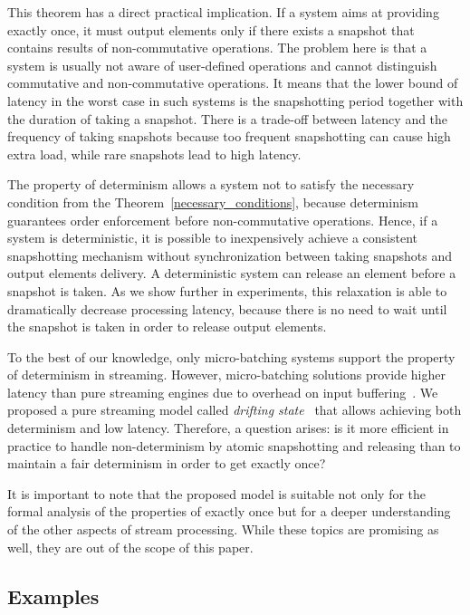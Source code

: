 This theorem has a direct practical implication. If a system aims at providing exactly once, it must output elements only if there exists a snapshot that contains results of non-commutative operations. The problem here is that a system is usually not aware of user-defined operations and cannot distinguish commutative and non-commutative operations. It means that the lower bound of latency in the worst case in such systems is the snapshotting period together with the duration of taking a snapshot. There is a trade-off between latency and the frequency of taking snapshots because too frequent snapshotting can cause high extra load, while rare snapshots lead to high latency.

The property of determinism allows a system not to satisfy the necessary condition from the Theorem~\ref{necessary_conditions}, because determinism guarantees order enforcement before non-commutative operations. Hence, if a system is deterministic, it is possible to inexpensively achieve a consistent snapshotting mechanism without synchronization between taking snapshots and output elements delivery. A deterministic system can release an element before a snapshot is taken. As we show further in experiments, this relaxation is able to dramatically decrease processing latency, because there is no need to wait until the snapshot is taken in order to release output elements.

To the best of our knowledge, only micro-batching systems support the property of determinism in streaming. However, micro-batching solutions provide higher latency than pure streaming engines due to overhead on input buffering~\cite{karimov2018benchmarking}. We proposed a pure streaming model called {\em drifting state}~\cite{we2018adbis} that allows achieving both determinism and low latency. Therefore, a question arises: is it more efficient in practice to handle non-determinism by atomic snapshotting and releasing than to maintain a fair determinism in order to get exactly once? 

It is important to note that the proposed model is suitable not only for the formal analysis of the properties of exactly once but for a deeper understanding of the other aspects of stream processing. While these topics are promising as well, they are out of the scope of this paper.

\subsection{Examples}

